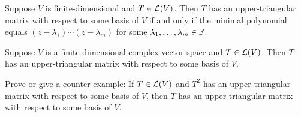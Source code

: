 \documentclass{extarticle}
\begin{document}
\begin{lemma}
    Suppose \(V\) is finite-dimensional and \(T \in \mathcal{L}(V)\). Then \(T\) has an upper-triangular matrix 
    with respect to some basis of \(V\) if and only if the minimal polynomial equals 
    \((z - \lambda_1)\cdots(z - \lambda_m)\) for some \(\lambda_1, \ldots, \lambda_m \in \mathbb{F}\).
\end{lemma}

\begin{thm}[if \(\F = \C\), then every operator on \(V\) has an upper-triangular matrix]
    Suppose \(V\) is a finite-dimensional complex vector space and \(T \in \mathcal{L}(V)\). Then \(T\) 
    has an upper-triangular matrix with respect to some basis of \(V\).
\end{thm}










\newpage 
{}

\begin{problem}{1}
    Prove or give a counter example: If \(T \in \mathcal{L}(V)\) and \(T^2\) has an upper-triangular matrix with 
    respect to some basis of \(V\), then \(T\) has an upper-triangular matrix with respect to some basis 
    of \(V\).
\end{problem}
\end{document}
